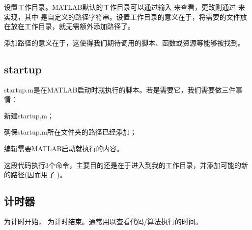 \item 设置工作目录。MATLAB默认的工作目录可以通过输入  来查看，更改则通过  来实现，其中  是自定义的路径字符串。设置工作目录的意义在于，将需要的文件放在放在工作目录，就无需额外添加路径了。

\myenddot

添加路径的意义在于，这使得我们期待调用的脚本、函数或资源等能够被找到。






\subsection{startup}

startup.m是在MATLAB启动时就执行的脚本。若是需要它，我们需要做三件事情：

\begindot
  \item 新建startup.m；
  \item 确保startup.m所在文件夹的路径已经添加；
  \item 编辑需要MATLAB启动就执行的内容。
\myenddot

\vspace{-0.8cm}


这段代码执行3个命令，主要目的还是在于进入到我的工作目录，并添加可能的新的路径(因而用了 )。





\subsection{计时器}

 为计时开始， 为计时结束。通常用以查看代码/算法执行的时间。

\vspace{-0.8cm}


\vspace{-0.8cm}


\vspace{-0.8cm}


